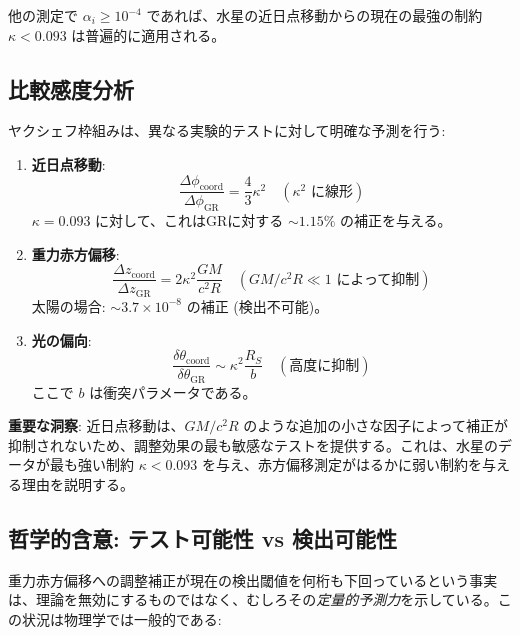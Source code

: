 \documentclass[11pt,a4paper]{article}
\begin{document}
	他の測定で $\alpha_i \geq 10^{-4}$ であれば、水星の近日点移動からの現在の最強の制約 $\kappa < 0.093$ は普遍的に適用される。
	
	\subsection{比較感度分析}
	\label{subsec:comparative-sensitivity}
	
	ヤクシェフ枠組みは、異なる実験的テストに対して明確な予測を行う:
	
	\begin{enumerate}
		\item \textbf{近日点移動}: 
		\[
		\frac{\Delta\phi_{\text{coord}}}{\Delta\phi_{\text{GR}}} = \frac{4}{3}\kappa^2 \quad (\text{$\kappa^2$ に線形})
		\]
		$\kappa = 0.093$ に対して、これはGRに対する $\sim 1.15\%$ の補正を与える。
		
		\item \textbf{重力赤方偏移}:
		\[
		\frac{\Delta z_{\text{coord}}}{\Delta z_{\text{GR}}} = 2\kappa^2 \frac{GM}{c^2R} \quad (\text{$GM/c^2R \ll 1$ によって抑制})
		\]
		太陽の場合: $\sim 3.7\times10^{-8}$ の補正 (検出不可能)。
		
		\item \textbf{光の偏向}:
		\[
		\frac{\delta\theta_{\text{coord}}}{\delta\theta_{\text{GR}}} \sim \kappa^2 \frac{R_S}{b} \quad (\text{高度に抑制})
		\]
		ここで $b$ は衝突パラメータである。
	\end{enumerate}
	
	\textbf{重要な洞察}: 近日点移動は、$GM/c^2R$ のような追加の小さな因子によって補正が抑制されないため、調整効果の最も敏感なテストを提供する。これは、水星のデータが最も強い制約 $\kappa < 0.093$ を与え、赤方偏移測定がはるかに弱い制約を与える理由を説明する。
	
	\subsection{哲学的含意: テスト可能性 vs 検出可能性}
	\label{subsec:philosophy-testability}
	
	重力赤方偏移への調整補正が現在の検出閾値を何桁も下回っているという事実は、理論を無効にするものではなく、むしろその\emph{定量的予測力}を示している。この状況は物理学では一般的である:
	
\end{document}
